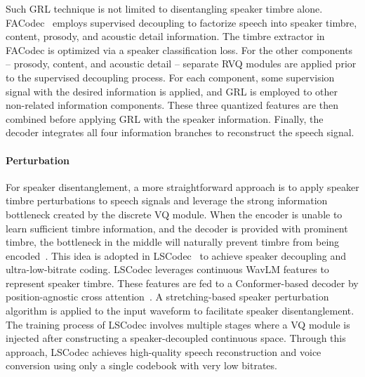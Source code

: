 Such GRL technique is not limited to disentangling speaker timbre alone.
FACodec~\cite{facodec} employs supervised decoupling to factorize speech into speaker timbre, content, prosody, and acoustic detail information.
The timbre extractor in FACodec is optimized via a speaker classification loss.
For the other components -- prosody, content, and acoustic detail -- separate RVQ modules are applied prior to the supervised decoupling process.
For each component, some supervision signal with the desired information is applied, and GRL is employed to other non-related information components.
These three quantized features are then combined before applying GRL with the speaker information. 
Finally, the decoder integrates all four information branches to reconstruct the speech signal.

\paragraph{Perturbation}
For speaker disentanglement, a more straightforward approach is to apply speaker timbre perturbations to speech signals and leverage the strong information bottleneck created by the discrete VQ module.
When the encoder is unable to learn sufficient timbre information, and the decoder is provided with prominent timbre, the bottleneck in the middle will naturally prevent timbre from being encoded~\cite{qian2019autovc}.
This idea is adopted in LSCodec~\cite{guo2024lscodec} to achieve speaker decoupling and ultra-low-bitrate coding.
LSCodec leverages continuous WavLM features to represent speaker timbre.
These features are fed to a Conformer-based decoder by position-agnostic cross attention~\cite{du2024unicats,li2024sef}.
A stretching-based speaker perturbation algorithm is applied to the input waveform to facilitate speaker disentanglement.
The training process of LSCodec involves multiple stages where a VQ module is injected after constructing a speaker-decoupled continuous space.
Through this approach, LSCodec achieves high-quality speech reconstruction and voice conversion using only a single codebook with very low bitrates.

